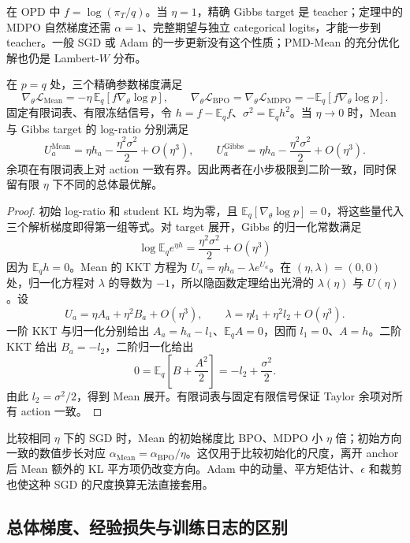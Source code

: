 在 OPD 中 $f=\log(\pi_T/q)$。当 $\eta=1$，精确 Gibbs target 是 teacher；定理中的 MDPO 自然梯度还需 $\alpha=1$、完整期望与独立 categorical logits，才能一步到 teacher。一般 SGD 或 Adam 的一步更新没有这个性质；PMD-Mean 的充分优化解也仍是 Lambert-$W$ 分布。

\begin{proposition}
\label{prop:ch2-eta-initial-scale}
在 $p=q$ 处，三个精确参数梯度满足
\[
 \nabla_\theta\mathcal L_{\mathrm{Mean}}
 =-\eta\,\mathbb E_q[f\nabla_\theta\log p],\qquad
 \nabla_\theta\mathcal L_{\mathrm{BPO}}
 =\nabla_\theta\mathcal L_{\mathrm{MDPO}}
 =-\mathbb E_q[f\nabla_\theta\log p].
\]
固定有限词表、有限冻结信号，令 $h=f-\mathbb E_qf$、$\sigma^2=\mathbb E_qh^2$。当 $\eta\to0$ 时，Mean 与 Gibbs target 的 log-ratio 分别满足
\[
 U_a^{\mathrm{Mean}}=\eta h_a-\frac{\eta^2\sigma^2}{2}+O(\eta^3),\qquad
 U_a^{\mathrm{Gibbs}}=\eta h_a-\frac{\eta^2\sigma^2}{2}+O(\eta^3).
\]
余项在有限词表上对 action 一致有界。因此两者在小步极限到二阶一致，同时保留有限 $\eta$ 下不同的总体最优解。
\end{proposition}

\begin{proof}
初始 log-ratio 和 student KL 均为零，且 $\mathbb E_q[\nabla_\theta\log p]=0$，将这些量代入三个解析梯度即得第一组等式。对 target 展开，Gibbs 的归一化常数满足
\[
 \log\mathbb E_qe^{\eta h}=\frac{\eta^2\sigma^2}{2}+O(\eta^3)
\]
因为 $\mathbb E_qh=0$。Mean 的 KKT 方程为 $U_a=\eta h_a-\lambda e^{U_a}$。在 $(\eta,\lambda)=(0,0)$ 处，归一化方程对 $\lambda$ 的导数为 $-1$，所以隐函数定理给出光滑的 $\lambda(\eta)$ 与 $U(\eta)$。设
\[
 U_a=\eta A_a+\eta^2B_a+O(\eta^3),\qquad
 \lambda=\eta l_1+\eta^2l_2+O(\eta^3).
\]
一阶 KKT 与归一化分别给出 $A_a=h_a-l_1$、$\mathbb E_qA=0$，因而 $l_1=0$、$A=h$。二阶 KKT 给出 $B_a=-l_2$，二阶归一化给出
\[
 0=\mathbb E_q\left[B+\frac{A^2}{2}\right]=-l_2+\frac{\sigma^2}{2}.
\]
由此 $l_2=\sigma^2/2$，得到 Mean 展开。有限词表与固定有限信号保证 Taylor 余项对所有 action 一致。
\end{proof}

比较相同 $\eta$ 下的 SGD 时，Mean 的初始梯度比 BPO、MDPO 小 $\eta$ 倍；初始方向一致的数值步长对应 $\alpha_{\mathrm{Mean}}=\alpha_{\mathrm{BPO}}/\eta$。这仅用于比较初始化的尺度，离开 anchor 后 Mean 额外的 KL 平方项仍改变方向。Adam 中的动量、平方矩估计、$\epsilon$ 和裁剪也使这种 SGD 的尺度换算无法直接套用。

\subsection{总体梯度、经验损失与训练日志的区别}
\label{subsec:ch2-population-empirical-surrogate}

